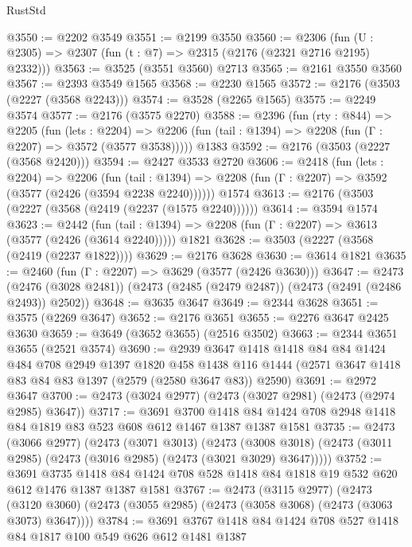\begin{lexlean}{RustStd}
\begin{coremodule}
{\begin{coremodule}
{{{{{{{{{{@3550 := @2202 @3549
@3551 := @2199 @3550
@3560 := @2306 (fun (U : @2305) => @2307 (fun (t : @7) => @2315 (@2176 (@2321 @2716 @2195) @2332)))
@3563 := @3525 (@3551 @3560) @2713
@3565 := @2161 @3550 @3560
@3567 := @2393 @3549 @1565
@3568 := @2230 @1565
@3572 := @2176 (@3503 (@2227 (@3568 @2243)))
@3574 := @3528 (@2265 @1565)
@3575 := @2249 @3574
@3577 := @2176 (@3575 @2270)
@3588 := @2396
    (fun (rty : @844) =>
    @2205
      (fun (lets : @2204) =>
      @2206 (fun (tail : @1394) => @2208 (fun (Γ : @2207) => @3572 (@3577 @3538)))))
    @1383
@3592 := @2176 (@3503 (@2227 (@3568 @2420)))
@3594 := @2427 @3533 @2720
@3606 := @2418
    (fun (lets : @2204) =>
    @2206
      (fun (tail : @1394) => @2208 (fun (Γ : @2207) => @3592 (@3577 (@2426 (@3594 @2238 @2240))))))
    @1574
@3613 := @2176 (@3503 (@2227 (@3568 (@2419 (@2237 (@1575 @2240))))))
@3614 := @3594 @1574
@3623 := @2442
    (fun (tail : @1394) => @2208 (fun (Γ : @2207) => @3613 (@3577 (@2426 (@3614 @2240)))))
    @1821
@3628 := @3503 (@2227 (@3568 (@2419 (@2237 @1822))))
@3629 := @2176 @3628
@3630 := @3614 @1821
@3635 := @2460 (fun (Γ : @2207) => @3629 (@3577 (@2426 @3630)))
@3647 := @2473
    (@2476 (@3028 @2481))
    (@2473 (@2485 (@2479 @2487)) (@2473 (@2491 (@2486 @2493)) @2502))
@3648 := @3635 @3647
@3649 := @2344 @3628
@3651 := @3575 (@2269 @3647)
@3652 := @2176 @3651
@3655 := @2276 @3647 @2425 @3630
@3659 := @3649 (@3652 @3655) (@2516 @3502)
@3663 := @2344 @3651 @3655 (@2521 @3574)
@3690 := @2939
    @3647
    @1418
    @1418
    @84
    @84
    @1424
    @484
    @708
    @2949
    @1397
    @1820
    @458
    @1438
    @116
    @1444
    (@2571 @3647 @1418 @83 @84 @83 @1397 (@2579 (@2580 @3647 @83)) @2590)
@3691 := @2972 @3647
@3700 := @2473 (@3024 @2977) (@2473 (@3027 @2981) (@2473 (@2974 @2985) @3647))
@3717 := @3691
    @3700
    @1418
    @84
    @1424
    @708
    @2948
    @1418
    @84
    @1819
    @83
    @523
    @608
    @612
    @1467
    @1387
    @1387
    @1581
@3735 := @2473
    (@3066 @2977)
    (@2473
      (@3071 @3013)
      (@2473 (@3008 @3018) (@2473 (@3011 @2985) (@2473 (@3016 @2985) (@2473 (@3021 @3029) @3647)))))
@3752 := @3691
    @3735
    @1418
    @84
    @1424
    @708
    @528
    @1418
    @84
    @1818
    @19
    @532
    @620
    @612
    @1476
    @1387
    @1387
    @1581
@3767 := @2473
    (@3115 @2977)
    (@2473 (@3120 @3060) (@2473 (@3055 @2985) (@2473 (@3058 @3068) (@2473 (@3063 @3073) @3647))))
@3784 := @3691
    @3767
    @1418
    @84
    @1424
    @708
    @527
    @1418
    @84
    @1817
    @100
    @549
    @626
    @612
    @1481
    @1387
}}}}}}}}}}
\end{coremodule}}
\end{coremodule}
\end{lexlean}
